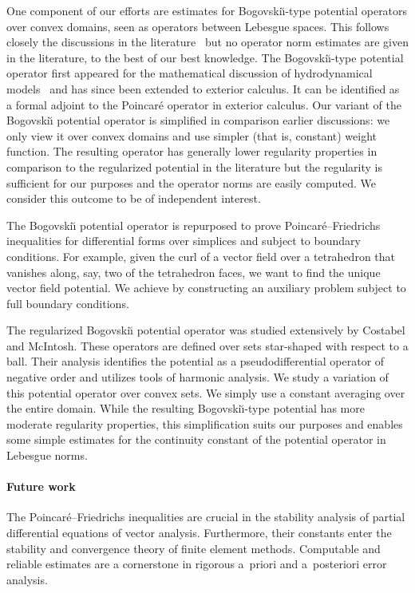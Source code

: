 \documentclass[a4paper]{article}
\begin{document}
One component of our efforts are estimates for Bogovski\u{\i}-type potential operators over convex domains, seen as operators between Lebesgue spaces. 
This follows closely the discussions in the literature~\cite{costabel2010bogovskiui} but no operator norm estimates are given in the literature, to the best of our best knowledge.
The Bogovski\u{\i}-type potential operator first appeared for the mathematical discussion of hydrodynamical models~\cite{bogovskii1979solution} and has since been extended to exterior calculus. 
It can be identified as a formal adjoint to the Poincar\'e operator in exterior calculus. 
Our variant of the Bogovski\u{\i} potential operator is simplified in comparison earlier discussions:
we only view it over convex domains and use simpler (that is, constant) weight function. 
The resulting operator has generally lower regularity properties in comparison to the regularized potential in the literature but the regularity is sufficient for our purposes and the operator norms are easily computed. We consider this outcome to be of independent interest. 

The Bogovski\u{\i} potential operator is repurposed to prove Poincar\'e--Friedrichs inequalities for differential forms over simplices and subject to boundary conditions. For example, given the curl of a vector field over a tetrahedron that vanishes along, say, two of the tetrahedron faces, we want to find the unique vector field potential. We achieve by constructing an auxiliary problem subject to full boundary conditions.

The regularized Bogovski\u{\i} potential operator was studied extensively by Costabel and McIntosh.
These operators are defined over sets star-shaped with respect to a ball. 
Their analysis identifies the potential as a pseudodifferential operator of negative order and utilizes tools of harmonic analysis. 
We study a variation of this potential operator over convex sets.
We simply use a constant averaging over the entire domain. 
While the resulting Bogovski\u{\i}-type potential has more moderate regularity properties, 
this simplification suits our purposes and enables some simple estimates for the continuity constant of the potential operator in Lebesgue norms. 



\paragraph{Future work}
The Poincar\'e--Friedrichs inequalities are crucial in the stability analysis of partial differential equations of vector analysis. Furthermore, their constants enter the stability and convergence theory of finite element methods. Computable and reliable estimates are a cornerstone in rigorous a~priori and a~posteriori error analysis. 
\end{document}
